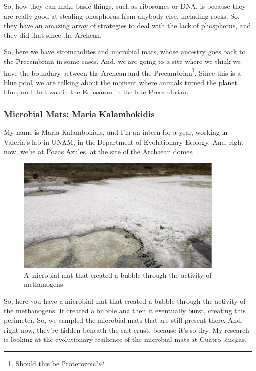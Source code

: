 \documentclass[]{article}
\begin{document}
So, how they can make basic things, such as ribosomes or DNA, is because they are really good at stealing phosphorus from anybody else, including rocks. So, they have an amazing array of strategies to deal with the lack of phosphorus, and they did that since the Archean.

So, here we have stromatolites and microbial mats, whose ancestry goes back
to the Precambrian in some cases. And, we are going to a site where we think we have the boundary between the Archean and the Precambrian\footnote{Should this be Proterozoic?}. Since this is a blue pool, we are talking about the moment where animals turned the planet blue, and that was in the Ediacaran in the late Precambrian.

\subsubsection{Microbial Mats: Maria Kalambokidis}
My name is Maria Kalambokidis, and I'm an intern for a year, working in Valeria's lab in UNAM, in the Department of Evolutionary Ecology. And, right now, we're at Pozas Azules, at the site of the Archaean domes. 

\begin{figure}[H]
	\caption[A microbial mat showing the activity of  methanogens]{A microbial mat that created a bubble through the activity of  methanogens} 
	\includegraphics[width=0.9\textwidth]{CuatroCienegas3}
\end{figure}

So, here you have a microbial mat that created a bubble through the activity of the methanogens. It created a bubble and then it eventually burst, creating this perimeter. So, we sampled the microbial mats that are still present there. And, right now, they're hidden beneath the salt crust, because it's so dry. My research is looking at the evolutionary resilience of the microbial mats at Cuatro i\'enegas.
\end{document}
